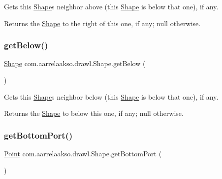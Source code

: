 Gets this \hyperlink{classcom_1_1aarrelaakso_1_1drawl_1_1_shape}{Shape}\textquotesingle{}s neighbor above (this \hyperlink{classcom_1_1aarrelaakso_1_1drawl_1_1_shape}{Shape} is below that one), if any. 

\begin{DoxyReturn}{Returns}
the \hyperlink{classcom_1_1aarrelaakso_1_1drawl_1_1_shape}{Shape} to the right of this one, if any; {\ttfamily null} otherwise. 
\end{DoxyReturn}
\mbox{\label{classcom_1_1aarrelaakso_1_1drawl_1_1_shape_a53de5ab609d879719cd3b372dfe8df58}} 
\subsubsection{\texorpdfstring{get\+Below()}{getBelow()}}
{\footnotesize\ttfamily \hyperlink{classcom_1_1aarrelaakso_1_1drawl_1_1_shape}{Shape} com.\+aarrelaakso.\+drawl.\+Shape.\+get\+Below (\begin{DoxyParamCaption}{ }\end{DoxyParamCaption})\hspace{0.3cm}{\ttfamily [inherited]}}



Gets this \hyperlink{classcom_1_1aarrelaakso_1_1drawl_1_1_shape}{Shape}\textquotesingle{}s neighbor below (this \hyperlink{classcom_1_1aarrelaakso_1_1drawl_1_1_shape}{Shape} is below that one), if any. 

\begin{DoxyReturn}{Returns}
the \hyperlink{classcom_1_1aarrelaakso_1_1drawl_1_1_shape}{Shape} to below this one, if any; {\ttfamily null} otherwise. 
\end{DoxyReturn}
\mbox{\label{classcom_1_1aarrelaakso_1_1drawl_1_1_shape_aba14efe9a16c0808580963c66b171082}} 
\subsubsection{\texorpdfstring{get\+Bottom\+Port()}{getBottomPort()}}
{\footnotesize\ttfamily \hyperlink{classcom_1_1aarrelaakso_1_1drawl_1_1_point}{Point} com.\+aarrelaakso.\+drawl.\+Shape.\+get\+Bottom\+Port (\begin{DoxyParamCaption}{ }\end{DoxyParamCaption})\hspace{0.3cm}{\ttfamily [inherited]}}



